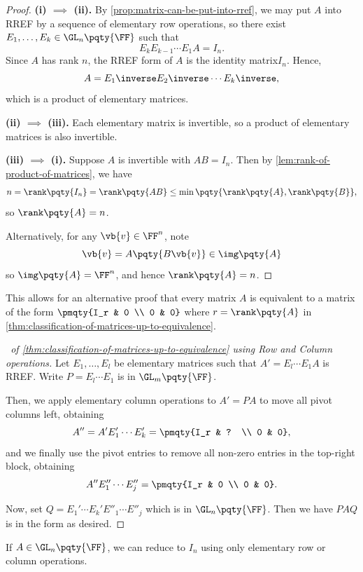 \begin{proof}
    \textbf{(i) \(\implies\) (ii).} By \autoref{prop:matrix-can-be-put-into-rref}, we may put \(A\) into RREF by a sequence of elementary row operations, so there exist \(E_1, \ldots, E_k \in \GL_n\pqty{\FF}\) such that
    \[
        E_k E_{k - 1} \cdots E_1 A = I_n.
    \]
    Since \(A\) has rank \(n\), the RREF form of \(A\) is the identity matrix\(I_n\). Hence,
    \[
        A = E_1\inverse E_2\inverse \cdots E_k\inverse,
    \]
    which is a product of elementary matrices.

    \textbf{(ii) \(\implies\) (iii).} Each elementary matrix is invertible, so a product of elementary matrices is also invertible.

    \textbf{(iii) \(\implies\) (i).} Suppose \(A\) is invertible with \(AB = I_n\). Then by \autoref{lem:rank-of-product-of-matrices}, we have
    \[
        n = \rank\pqty{I_n} = \rank\pqty{AB} \leq \min\pqty{\rank\pqty{A}, \rank\pqty{B}},
    \]
    so \(\rank \pqty{A} = n\).
    
    Alternatively, for any \(\vb{v} \in \FF^n\), note
    \[
        \vb{v} = A \pqty{B \vb{v}} \in \img \pqty{A}
    \]
    so \(\img\pqty{A} = \FF^n\), and hence \(\rank\pqty{A} = n\).
\end{proof}

This allows for an alternative proof that every matrix \(A\) is equivalent to a matrix of the form \(\pmqty{I_r & 0 \\ 0 & 0}\) where \(r = \rank\pqty{A}\) in \autoref{thm:classification-of-matrices-up-to-equivalence}.

\begin{proof}[\proofname\ of \autoref{thm:classification-of-matrices-up-to-equivalence} using Row and Column operations]
    Let \(E_1, \ldots, E_l\) be elementary matrices such that \(A' = E_l \cdots E_1 A\) is RREF. Write \(P = E_l \cdots E_1\) is in \(\GL_m\pqty{\FF}\).

    Then, we apply elementary column operations to \(A' = PA\) to move all pivot columns left, obtaining
    \[
        A'' = A' E_1' \cdots E_k' = \pmqty{I_r & ? \\ 0 & 0},
    \]
    and we finally use the pivot entries to remove all non-zero entries in the top-right block, obtaining
    \[
        A'' E''_1 \cdots E''_j = \pmqty{I_r & 0 \\ 0 & 0}.
    \]

    Now, set \(Q = E_1' \cdots E_k' E''_1 \cdots E''_j\) which is in \(\GL_n\pqty{\FF}\). Then we have \(PAQ\) is in the form as desired.
\end{proof}

\begin{remark}
    If \(A \in \GL_n\pqty{\FF}\), we can reduce to \(I_n\) using only elementary row or column operations.
\end{remark}
